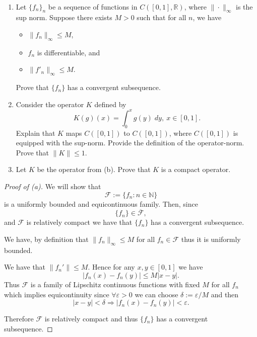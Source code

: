 \begin{prob}[2 Exam 2024]
    \
    \begin{enumerate}[label=\alph*)]
        \item Let $\{f_n\}_n$ be a sequence of functions in 
            $C([0,1], \mathbb R)$, where $\|\cdot\|_\infty$ is the 
            sup norm. Suppose there exists $M > 0$ such that for 
            all $n$, we have 
            \begin{itemize}
                \item $\|f_n\|_\infty \leq M$, 
                \item $f_n$ is differentiable, and 
                \item $\|f'_n\|_\infty \leq M$.
            \end{itemize}
            Prove that $\{f_n\}$ has a convergent subsequence.
        \item Consider the operator $K$ defined by 
            \[
                K(g)(x) = \int_0^x g(y) \; dy, \ x \in [0,1].
            \]
            Explain that $K$ maps $C([0,1])$ to $C([0,1])$, where 
            $C([0,1])$ is equipped with the sup-norm.
            Provide the definition of the operator-norm. 
            Prove that $\|K\| \leq 1$.
        \item Let $K$ be the operator from (b). 
            Prove that $K$ is a compact operator.
    \end{enumerate}
\end{prob}
\begin{proof}[Proof of (a)]
    We will show that 
    \[
        \mathcal F := \{f_n : n \in \mathbb N\}
    \]
    is a uniformly bounded and equicontinuous 
    family. Then, since 
    \[
        \{f_n\} \in \overline{\mathcal F},
    \]
    and $\mathcal F$ is relatively compact
    we have that $\{f_n\}$ has a convergent subsequence. 

    We have, by definition that $\|f_n\|_\infty \leq M$ for 
    all $f_n \in \mathcal F$ thus it is uniformly bounded. 

    We have that $\|f_n'\| \leq M$. Hence for any $x,y \in [0,1]$ 
    we have 
    \[
        |f_n(x) - f_n(y)| \leq M|x-y|. 
    \]
    Thus $\mathcal F$ is a family of Lipschitz continuous functions 
    with fixed $M$ for all $f_n$ which implies equicontinuity since 
    $\forall \varepsilon > 0$ we can choose $\delta := \varepsilon / 
    M$ and then 
    \[
        |x-y| < \delta 
        \Rightarrow 
        |f_n(x) - f_n(y)| < \varepsilon. 
    \]

    Therefore $\mathcal F$ is relatively compact and thus 
    $\{f_n\}$ has a convergent subsequence. 
\end{proof}
